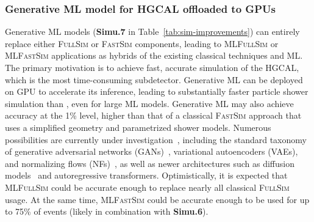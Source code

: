 \subsubsection{Generative ML model for \gls{HGCAL} offloaded to \glspl{GPU}}
\label{subsubsec:genml}
Generative \gls{ML} models (\textbf{Simu.7} in Table~\ref{tab:sim-improvements}) can entirely replace either \textsc{FullSim} or \textsc{FastSim} components, leading to \textsc{MLFullSim} or \textsc{MLFastSim} applications as hybrids of the existing classical techniques and \gls{ML}.
The primary motivation is to achieve fast, accurate simulation of the \gls{HGCAL}, which is the most time-consuming \PhaseTwo subdetector.
Generative \gls{ML} can be deployed on \gls{GPU} to accelerate its inference, leading to substantially faster particle shower simulation than \GEANTfour, even for large \gls{ML} models.
Generative \gls{ML} may also achieve accuracy at the 1\% level, higher than that of a classical \textsc{FastSim} approach that uses a simplified geometry and parametrized shower models. Numerous possibilities are currently under investigation~\cite{Adelmann:2022ozp,Hashemi:2023rgo}, including the standard taxonomy of generative adversarial networks (GANs)~\cite{Scham:2023usu}, variational autoencoders (VAEs), and normalizing flows (NFs)~\cite{Schnake:2024mip}, as well as newer architectures such as diffusion models~\cite{Amram:2023onf,Buhmann:2023kdg} and autoregressive transformers.
Optimistically, it is expected that \textsc{MLFullSim} could be accurate enough to replace nearly all classical \textsc{FullSim} usage. At the same time, \textsc{MLFastSim} could be accurate enough to be used for up to 75\% of events (likely in combination with \textbf{Simu.6}).


